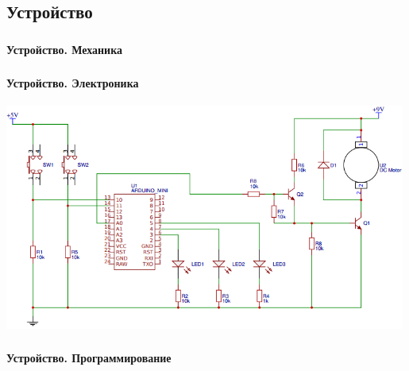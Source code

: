 \subsection{Устройство}

\begin{frame}
    \frametitle{\myDevice}
    \framesubtitle{Устройство. Механика}
\end{frame}

\begin{frame}
    \frametitle{\myDevice}
    \framesubtitle{Устройство. Электроника}
    
    \begin{center}
        \includegraphics[width=0.99\textwidth]{fig/eScheme}
    \end{center}
\end{frame}

\begin{frame}
    \frametitle{\myDevice}
    \framesubtitle{Устройство. Программирование}
\end{frame}

